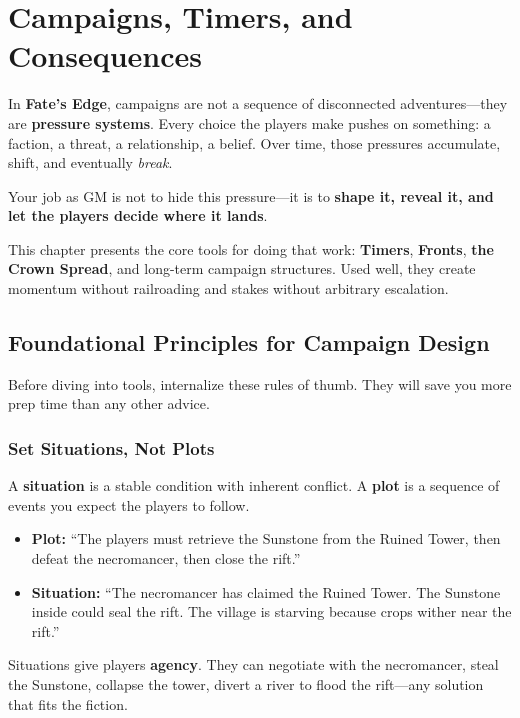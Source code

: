 \chapter{Campaigns, Timers, and Consequences}
\label{ch:campaigns-timers}

In \textbf{Fate's Edge}, campaigns are not a sequence of disconnected adventures---they are \textbf{pressure systems}.  
Every choice the players make pushes on something: a faction, a threat, a relationship, a belief. Over time, those pressures accumulate, shift, and eventually \emph{break}.

Your job as GM is not to hide this pressure---it is to \textbf{shape it, reveal it, and let the players decide where it lands}.

This chapter presents the core tools for doing that work: \textbf{Timers}, \textbf{Fronts}, \textbf{the Crown Spread}, and long-term campaign structures. Used well, they create momentum without railroading and stakes without arbitrary escalation.

\section{Foundational Principles for Campaign Design}

Before diving into tools, internalize these rules of thumb. They will save you more prep time than any other advice.

\subsection{Set Situations, Not Plots}

A \textbf{situation} is a stable condition with inherent conflict. A \textbf{plot} is a sequence of events you expect the players to follow.

\begin{itemize}
  \item \textbf{Plot:} ``The players must retrieve the Sunstone from the Ruined Tower, then defeat the necromancer, then close the rift.''
  \item \textbf{Situation:} ``The necromancer has claimed the Ruined Tower. The Sunstone inside could seal the rift. The village is starving because crops wither near the rift.''
\end{itemize}

Situations give players \textbf{agency}. They can negotiate with the necromancer, steal the Sunstone, collapse the tower, divert a river to flood the rift---any solution that fits the fiction.

